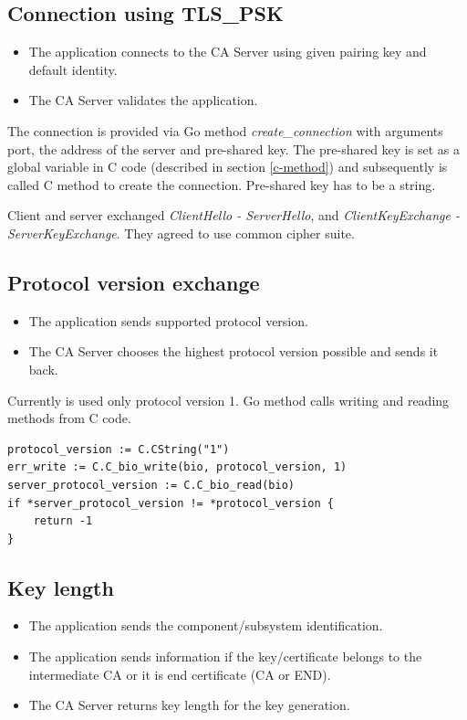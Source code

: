 \documentclass[
  twoside, 12pt, 
  printed, %
  notable,   %
  lof,     %
  lot,     %
]{fithesis3}
\begin{document}
\subsection{Connection using TLS\_PSK}
\begin{itemize}[leftmargin=2em,rightmargin=1em,itemsep=0.75\parskip,parsep=0em,topsep=0em,partopsep=0em]
\item The application connects to the CA Server using given pairing key and default identity.
\item The CA Server validates the application.
\end{itemize}

The connection is provided via Go method \textit{create\_connection} with arguments port, the 
address of the server and pre-shared key. The pre-shared key is set as a global variable in C code 
(described in section \ref{c-method}) and subsequently is called C method to create the connection. 
Pre-shared key has to be a string.

Client and server exchanged \textit{ClientHello - ServerHello}, and \textit{ClientKeyExchange - 
ServerKeyExchange}. They agreed to use common cipher suite. 

\subsection{Protocol version exchange}
\begin{itemize}[leftmargin=2em,rightmargin=1em,itemsep=0.75\parskip,parsep=0em,topsep=0em,partopsep=0em]
\item The application sends supported protocol version.
\item The CA Server chooses the highest protocol version possible and sends it back.
\end{itemize}

Currently is used only protocol version 1. Go method calls writing and reading methods from C 
code.

\begin{lstlisting}
protocol_version := C.CString("1")
err_write := C.C_bio_write(bio, protocol_version, 1)
server_protocol_version := C.C_bio_read(bio)
if *server_protocol_version != *protocol_version {
	return -1
} 
\end{lstlisting}


\subsection{Key length}
\begin{itemize}[leftmargin=2em,rightmargin=1em,itemsep=0.75\parskip,parsep=0em,topsep=0em,partopsep=0em]
\item The application sends the component/subsystem identification.
\item The application sends information if the key/certificate belongs to the intermediate CA or it is end certificate (CA or END).
\item The CA Server returns key length for the key generation.
\end{itemize}
    
\end{document}
